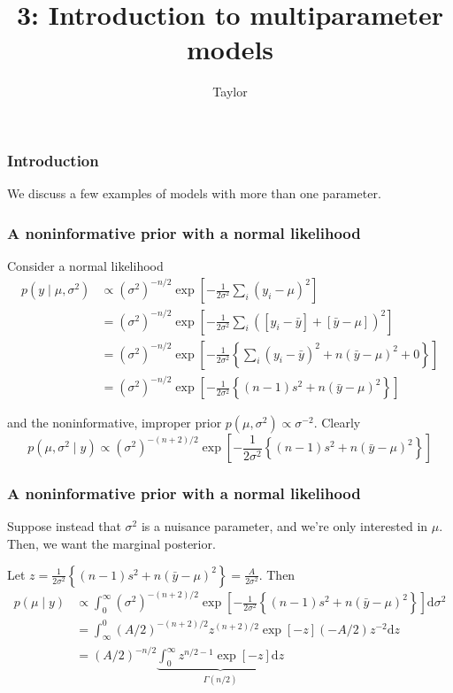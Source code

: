 \documentclass{beamer}
\title["3"]{3: Introduction to multiparameter models}
\author{Taylor}
\institute[UVA] 
{
University of Virginia \\
\medskip
\textit{} 
}
\date{}
\begin{document}

\begin{frame}
\titlepage 
\end{frame}

\begin{frame}
\frametitle{Introduction}

We discuss a few examples of models with more than one parameter.


\end{frame}


\begin{frame}
\frametitle{A noninformative prior with a normal likelihood}

Consider a normal likelihood
\begin{align*}
p(y \mid \mu, \sigma^2) &\propto (\sigma^2)^{-n/2}\exp\left[ - \frac{1}{2\sigma^2} \sum_i(y_i- \mu)^2 \right] \\
&= (\sigma^2)^{-n/2}\exp\left[ - \frac{1}{2\sigma^2} \sum_i([y_i- \bar{y}] + [\bar{y} - \mu])^2 \right] \\
&= (\sigma^2)^{-n/2}\exp\left[ - \frac{1}{2\sigma^2} \left\{ \sum_i(y_i- \bar{y})^2 + n(\bar{y} - \mu)^2 + 0 \right\} \right] \\
&= (\sigma^2)^{-n/2} \exp\left[ - \frac{1}{2\sigma^2}\left\{(n-1)  s^2 + n(\bar{y} - \mu)^2 \right\} \right]
\end{align*}

and the noninformative, improper prior $p(\mu, \sigma^2) \propto \sigma^{-2}$. Clearly 
\[
p(\mu, \sigma^2 \mid y) \propto (\sigma^2)^{-(n+2)/2}\exp\left[ - \frac{1}{2\sigma^2}\left\{(n-1)  s^2 + n(\bar{y} - \mu)^2 \right\} \right]
\]

\end{frame}
\begin{frame}
\frametitle{A noninformative prior with a normal likelihood}

Suppose instead that $\sigma^2$ is a nuisance parameter, and we're only interested in $\mu$. Then, we want the marginal posterior.
\newline

Let $z = \frac{1}{2\sigma^2}\left\{(n-1)  s^2 + n(\bar{y} - \mu)^2 \right\} = \frac{A}{2\sigma^2}$. Then
\begin{align*}
p(\mu \mid y) &\propto \int_0^{\infty} (\sigma^2)^{-(n+2)/2} \exp\left[ - \frac{1}{2\sigma^2}\left\{(n-1)  s^2 + n(\bar{y} - \mu)^2 \right\} \right] \text{d} \sigma^2 \\
&= \int_{\infty}^0 (A/2)^{-(n+2)/2}z^{(n+2)/2} \exp\left[ - z \right] (-A/2)z^{-2}\text{d} z \\
&= (A/2)^{-n/2} \underbrace{\int^{\infty}_0 z^{n/2-1} \exp\left[ - z \right] \text{d} z}_{\Gamma(n/2)} \\
\end{align*}


\end{frame}
\end{document}
